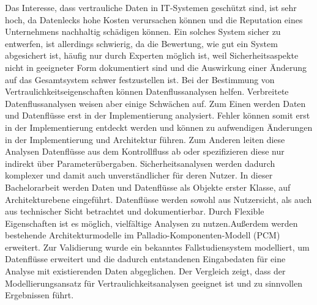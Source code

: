 
\Abstract
Das Interesse, dass vertrauliche Daten in IT-Systemen geschützt sind, ist sehr hoch, da Datenlecks hohe Kosten verursachen können und die Reputation eines Unternehmens nachhaltig schädigen können.
Ein solches System sicher zu entwerfen, ist allerdings schwierig, da die Bewertung, wie gut ein System abgesichert ist, häufig nur durch Experten möglich ist, weil Sicherheitsaspekte nicht in geeigneter Form dokumentiert sind und die Auswirkung einer Änderung auf das Gesamtsystem schwer festzustellen ist. Bei der Bestimmung von Vertraulichkeitseigenschaften können Datenflussanalysen helfen.
Verbreitete Datenflussanalysen weisen aber einige Schwächen auf. Zum Einen werden Daten und Datenflüsse erst in der Implementierung analysiert. Fehler können somit erst in der Implementierung entdeckt werden und können zu aufwendigen Änderungen in der Implementierung und Architektur führen. Zum Anderen leiten diese Analysen Datenflüsse aus dem Kontrollfluss ab oder spezifizieren diese nur indirekt über Parameterübergaben. Sicherheitsanalysen werden dadurch komplexer und damit auch unverständlicher für deren Nutzer.
In dieser Bachelorarbeit werden Daten und Datenflüsse als Objekte erster Klasse, auf Architekturebene eingeführt. Datenflüsse werden sowohl aus Nutzersicht, als auch aus technischer Sicht betrachtet und dokumentierbar. Durch Flexible Eigenschaften ist es möglich, vielfältige Analysen zu nutzen.Außerdem werden bestehende Architekturmodelle im Palladio-Komponenten-Modell (PCM) erweitert.
Zur Validierung wurde ein bekanntes Fallstudiensystem modelliert, um Datenflüsse erweitert und die dadurch entstandenen Eingabedaten für eine Analyse mit existierenden Daten abgeglichen. Der Vergleich zeigt, dass der Modellierungsansatz für Vertraulichkeitsanalysen geeignet ist und zu sinnvollen Ergebnissen führt.